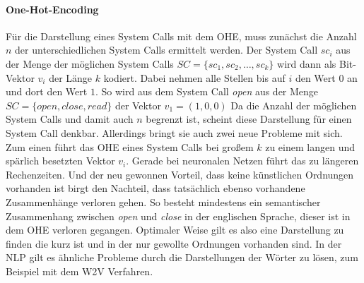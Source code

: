             \paragraph{One-Hot-Encoding}
                Für die Darstellung eines System Calls mit dem \ac{OHE}, muss zunächst die Anzahl $n$ der unterschiedlichen System Calls ermittelt werden.
                Der System Call $sc_i$ aus der Menge der möglichen System Calls $ SC = \{sc_1,sc_2,\dots,sc_k\}$ 
                wird dann als Bit-Vektor $v_i$ der Länge $k$ kodiert.
                Dabei nehmen alle Stellen bis auf $i$ den Wert $0$ an und dort den Wert $1$.
                So wird aus dem System Call \textit{open} aus der Menge $SC = \{open, close, read\}$ der Vektor $v_1 = (1, 0, 0)$
                Da die Anzahl der möglichen System Calls und damit auch $n$ begrenzt ist, scheint diese Darstellung für einen System Call denkbar.
                Allerdings bringt sie auch zwei neue Probleme mit sich.
                Zum einen führt das \ac{OHE} eines System Calls bei großem $k$ zu einem langen und spärlich besetzten Vektor $v_i$.
                Gerade bei neuronalen Netzen führt das zu längeren Rechenzeiten.
                Und der neu gewonnen Vorteil, dass keine künstlichen Ordnungen vorhanden ist birgt den Nachteil, dass tatsächlich ebenso vorhandene Zusammenhänge verloren gehen.
                So besteht mindestens ein semantischer Zusammenhang zwischen \textit{open} und \textit{close} in der englischen Sprache, dieser ist in dem \ac{OHE} verloren gegangen. 
                Optimaler Weise gilt es also eine Darstellung zu finden die kurz ist und in der nur gewollte Ordnungen vorhanden sind.
                In der \ac{NLP} gilt es ähnliche Probleme durch die Darstellungen der Wörter zu lösen, zum Beispiel mit dem \ac{W2V} Verfahren.

